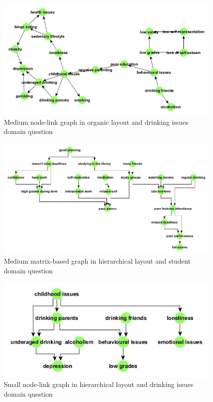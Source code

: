 \documentclass{l4proj}
\begin{document}
\begin{appendices}
\begin{figure}[H]
\centering
\includegraphics[width=15cm]{images/drinkingIssuesMedOrganic.jpg}
\caption{Medium node-link graph in organic layout and drinking issues domain question}
\label{drinkingIssuesMedOrganic}
\end{figure}


\begin{figure}
\centering
\includegraphics[width=18cm]{images/studentMedHier.jpg}
\caption{Medium matrix-based graph in hierarchical layout and student domain question}
\label{studentMedHier}
\end{figure}


\begin{figure}[H]
\centering
\includegraphics[width=12cm]{images/drinkingIssuesSmallHier.jpg}
\caption{Small node-link graph in hierarchical layout and drinking issues domain question}
\label{drinkingIssuesSmallHier}
\end{figure}



\end{appendices}
\end{document}
